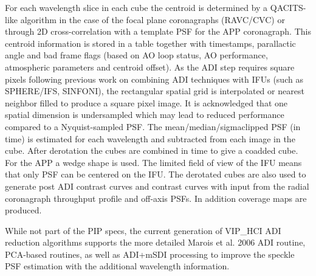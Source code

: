 For each wavelength slice in each cube the centroid is determined by a QACITS-like algorithm in the case of the focal plane coronagraphs (RAVC/CVC) or through 2D cross-correlation with a template PSF for the APP coronagraph. This centroid information is stored in a table together with timestamps, parallactic angle and bad frame flags (based on AO loop status, AO performance, atmospheric parameters and centroid offset).
As the ADI step requires square pixels following previous work on combining ADI techniques with IFUs (such as SPHERE/IFS, SINFONI), the rectangular spatial grid is interpolated or nearest neighbor filled to produce a square pixel image.
It is acknowledged that one spatial dimension is undersampled which may lead to reduced performance compared to a Nyquist-sampled PSF.
The mean/median/sigmaclipped PSF (in time) is estimated for each wavelength and subtracted from each image in the cube.
After derotation the cubes are combined in time to give a coadded cube. For the APP a wedge shape is used. The limited field of view of the IFU means that only PSF can be centered on the IFU. The derotated cubes are also used to generate post ADI contrast curves and contrast curves with input from the radial coronagraph throughput profile and off-axis PSFs. In addition coverage maps are produced.

While not part of the PIP specs, the current generation of VIP\_HCI ADI reduction algorithms supports
the more detailed Marois et al. 2006 ADI routine, PCA-based routines, as well as ADI+mSDI processing to improve the speckle PSF estimation with the additional wavelength information.



